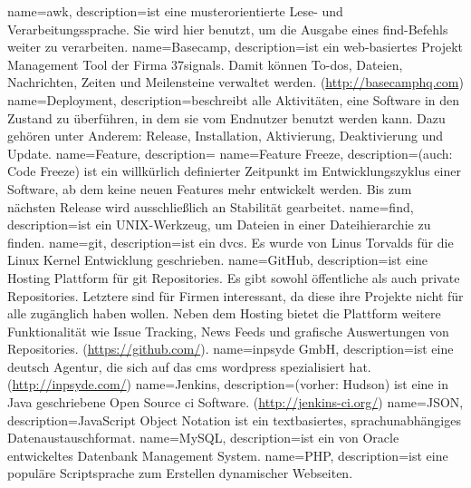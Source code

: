  {
  name=awk,
  description={ist eine musterorientierte Lese- und Verarbeitungssprache. Sie wird hier benutzt, um die Ausgabe eines \gls{find}-Befehls weiter zu verarbeiten. \cite{manpage_awk}}
}
 {
  name=Basecamp,
  description={ist ein web-basiertes Projekt Management Tool der Firma 37signals. Damit können To-dos, Dateien, Nachrichten, Zeiten und Meilensteine verwaltet werden. (\url{http://basecamphq.com})}
}
 {
  name=Deployment,
  description={beschreibt alle Aktivitäten, eine Software in den Zustand zu überführen, in dem sie vom Endnutzer benutzt werden kann. Dazu gehören unter Anderem: Release, Installation, Aktivierung, Deaktivierung und Update. \cite{deployment_tech}}
}
 {
  name=Feature,
  description={}
}
 {
  name=Feature Freeze,
  description={(auch: Code Freeze) ist ein willkürlich definierter Zeitpunkt im Entwicklungszyklus einer Software, ab dem keine neuen Features mehr entwickelt werden. Bis zum nächsten Release wird ausschließlich an Stabilität gearbeitet. \cite[S.298]{praxiswissen_softwareing}}
}
 {
  name=find,
  description={ist ein UNIX-Werkzeug, um Dateien in einer Dateihierarchie zu finden. \cite{manpage_find}}
}
 {
  name=git,
  description={ist ein \gls{dvcs}. Es wurde von Linus Torvalds für die Linux Kernel Entwicklung geschrieben.}
}
 {
  name=GitHub,
  description={ist eine Hosting Plattform für \gls{git} Repositories. Es gibt sowohl öffentliche als auch private Repositories. Letztere sind für Firmen interessant, da diese ihre Projekte nicht für alle zugänglich haben wollen. Neben dem Hosting bietet die Plattform weitere Funktionalität wie Issue Tracking, News Feeds und grafische Auswertungen von Repositories. (\url{https://github.com/})}.
}
 {
  name=inpsyde GmbH,
  description={ist eine deutsch Agentur, die sich auf das \gls{cms} \gls{wordpress} spezialisiert hat. (\url{http://inpsyde.com/})}
}
 {
  name=Jenkins,
  description={(vorher: Hudson) ist eine in Java geschriebene Open Source \gls{ci} Software. (\url{http://jenkins-ci.org/})}
}
 {
  name=JSON,
  description={JavaScript Object Notation ist ein textbasiertes, sprachunabhängiges Datenaustauschformat. \cite{json}}
}
 {
  name=MySQL,
  description={ist ein von Oracle entwickeltes Datenbank Management System.}
}
 {
  name=PHP,
  description={ist eine populäre Scriptsprache zum Erstellen dynamischer Webseiten.}
}
